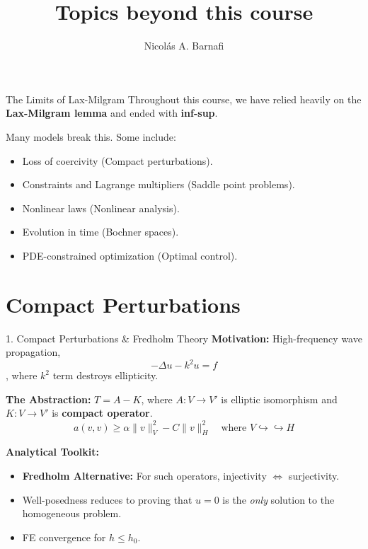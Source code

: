 \documentclass[aspectratio=169]{beamer}
\title{Topics beyond this course}
\author{Nicol\'as A. Barnafi}
\date{}
\begin{document}
\begin{frame}
    \titlepage
\end{frame}

\begin{frame}{The Limits of Lax-Milgram}
    Throughout this course, we have relied heavily on the \textbf{Lax-Milgram lemma} and ended with \textbf{inf-sup}.

    \vspace{0.3cm}
    Many  models break this. Some include:
    \begin{itemize}
        \item Loss of coercivity (Compact perturbations).
        \item Constraints and Lagrange multipliers (Saddle point problems).
        \item Nonlinear  laws  (Nonlinear analysis).
        \item Evolution in time (Bochner spaces).
        \item PDE-constrained optimization (Optimal control).
    \end{itemize}
\end{frame}

\section{Compact Perturbations}
\begin{frame}{1. Compact Perturbations \& Fredholm Theory}
    \textbf{Motivation:} High-frequency wave propagation, $$-\Delta u - k^2 u = f$$, where  $k^2$ term destroys ellipticity.

    \vspace{0.2cm}
    \textbf{The Abstraction:}
    $T=A - K$, where $A: V \to V'$ is elliptic isomorphism and $K: V \to V'$ is \textbf{compact operator}.
    $$ a(v, v) \ge \alpha \|v\|_V^2 - C \|v\|_H^2 \quad \text{where } V \hookrightarrow\hookrightarrow H $$

    \vspace{0.2cm}
    \textbf{Analytical Toolkit:}
    \begin{itemize}
        \item \textbf{Fredholm Alternative:} For such operators, injectivity $\iff$ surjectivity.
        \item Well-posedness reduces to proving that $u=0$ is the \textit{only} solution to the homogeneous problem.
        \item FE convergence for $h\leq h_0$.
    \end{itemize}
\end{frame}
\end{document}
